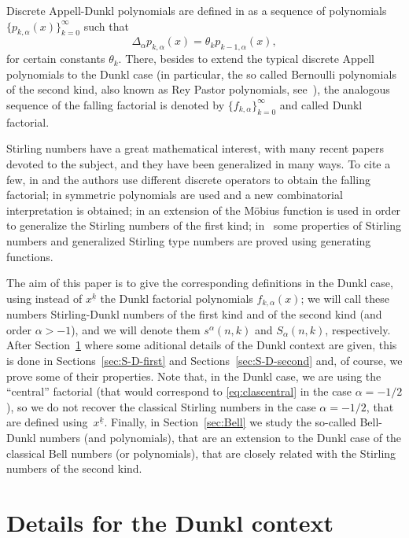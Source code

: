 \documentclass[11pt,a4paper]{article}
\theoremstyle{plain}
\theoremstyle{remark}
\begin{document}
Discrete Appell-Dunkl polynomials are defined in \cite{ELMV} as a sequence of polynomials $\{p_{k,\alpha}(x)\}_{k=0}^{\infty}$ such that
\[
  \Delta_{\alpha}p_{k,\alpha}(x) = \theta_k p_{k-1,\alpha}(x),
\]
for certain constants $\theta_k$.
There, besides to extend the typical discrete Appell polynomials to the Dunkl case (in particular, the so called Bernoulli polynomials of the second kind, also known as Rey Pastor polynomials, see~\cite{Jor, RP-BSMA, Bab, Car}), the analogous sequence of the falling factorial is denoted by $\{f_{k,\alpha}\}_{k=0}^{\infty}$ and called Dunkl factorial. 

Stirling numbers have a great mathematical interest, with many recent papers devoted to the subject, and they have been generalized in many ways. To cite a few, in \cite[\S\,18]{Cho} and \cite{Tem} the authors use different discrete operators to obtain the falling factorial; in \cite{AARV, KS} symmetric polynomials are used and a new combinatorial interpretation is obtained; in \cite{BM} an extension of the M\"obius function is used in order to generalize the Stirling numbers of the first kind; in~\cite{Simsek1, Simsek3} some properties of Stirling numbers and generalized Stirling type numbers are proved using generating functions.

The aim of this paper is to give the corresponding definitions in the Dunkl case, using instead of $x^{\underline{k}}$ the Dunkl factorial polynomials $f_{k,\alpha}(x)$; we will call these numbers Stirling-Dunkl numbers of the first kind and of the second kind (and order $\alpha>-1$), and we will denote them $s^\alpha(n,k)$ and $S_\alpha(n,k)$, respectively. 
After Section~\ref{sec:Dunkl} where some aditional details of the Dunkl context are given, this is done in Sections~\ref{sec:S-D-first} and Sections~\ref{sec:S-D-second} and, of course, we prove some of their properties. Note that, in the Dunkl case, we are using the ``central'' factorial (that would correspond to \eqref{eq:clascentral} in the case $\alpha=-1/2$), so we do not recover the classical Stirling numbers in the case $\alpha=-1/2$, that are defined using~$x^{\underline{k}}$. Finally, in Section~\ref{sec:Bell} we study the so-called Bell-Dunkl numbers (and polynomials), that are an extension to the Dunkl case of the classical Bell numbers (or polynomials), that are closely related with the Stirling numbers of the second kind.

\section{Details for the Dunkl context}
\label{sec:Dunkl}
\end{document}
